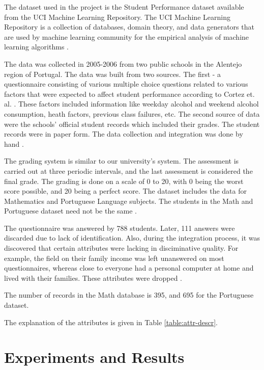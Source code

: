 \documentclass[conference]{IEEEtran}
\begin{document}
The dataset used in the project is the Student Performance dataset available from the UCI 
Machine Learning Repository. The UCI Machine Learning Repository is a collection of databases, 
domain theory, and data generators that are used by machine learning community for the empirical 
analysis of machine learning algorithms \cite{Lichman:2013}.

The data was collected in 2005-2006 from two public schools in the Alentejo region of Portugal. 
The data was built from two sources. The first - a questionnaire consisting of various multiple choice 
questions related to various factors that were expected to affect student performance according 
to Cortez et. al. \cite{ref:4}. These factors included information like weekday alcohol and 
weekend alcohol consumption, heath factors, previous class failures, etc. The second source of 
data were the schools' official student records which included their grades. The student records 
were in paper form. The data collection and integration was done by hand \cite{ref:4}.

The grading system is similar to our university's system. The assessment is carried out at three 
periodic intervals, and the last assessment is considered the final grade. The grading is done on a scale 
of 0 to 20, with 0 being the worst score possible, and 20 being a perfect score. The dataset includes 
the data for Mathematics and Portuguese Language subjects. The students in the Math and Portuguese dataset 
need not be the same \cite{ref:4}.

The questionnaire was answered by 788 students. Later, 111 answers were discarded due to lack of identification. 
Also, during the integration process, it was discovered that certain attributes were lacking in disciminative 
quality. For example, the field on their family income was left unanswered on most questionnaires, whereas close 
to everyone had a personal computer at home and lived with their families. These attributes were dropped \cite{ref:4}.

The number of records in the Math database is 395, and 695 for the Portuguese dataset.

The explanation of the attributes is given in Table \ref{table:attr-descr}.
	\section{Experiments and Results} \label{expts-reslts}
\end{document}
